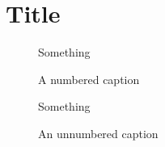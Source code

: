 \documentclass{tufte-book}
\begin{document}
\listoffigures

\chapter{Title}

\lipsum[2]

\begin{figure}
Something
\caption{A numbered caption}
\end{figure}

\lipsum[3]

\begin{figure}
Something
\caption{An unnumbered caption}
\end{figure}

\lipsum[4]
\end{document}
